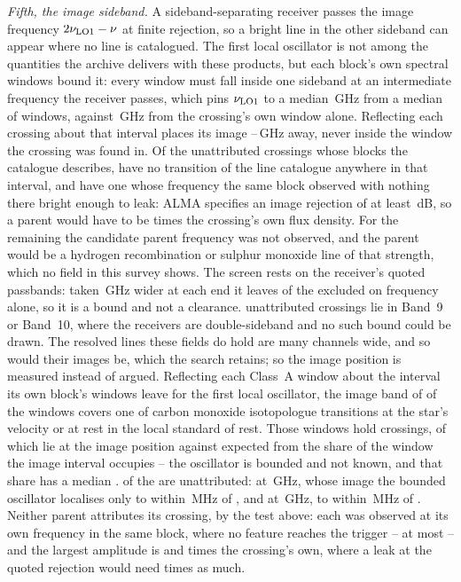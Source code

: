 \emph{Fifth, the image sideband.} A sideband-separating receiver passes the
image frequency $2\nu_{\rm LO1}-\nu$ at finite rejection, so a bright line
in the other sideband can appear where no line is catalogued. The first
local oscillator is not among the quantities the archive delivers with these
products, but each block's own spectral windows bound it: every window must
fall inside one sideband at an intermediate frequency the receiver passes,
which pins $\nu_{\rm LO1}$ to a median \ImLoWidthBlkGHz\,GHz from a median
of \ImNWinUsed{} windows, against \ImLoWidthOwnGHz\,GHz from the crossing's
own window alone. Reflecting each crossing about that interval places its
image \ImGapLoGHz--\ImGapHiGHz\,GHz away, never inside the window the
crossing was found in. Of the \ImNScreen{} unattributed crossings whose
blocks the catalogue describes, \ImNNoParent{} have no transition of the
line catalogue anywhere in that interval, and \ImNParentAbsent{} have one
whose frequency the same block observed with nothing there bright enough to
leak: ALMA specifies an image rejection of at least \ImIrrDb\,dB, so a
parent would have to be \ImIrrFac{} times the crossing's own flux density. For the
remaining \ImNLeft{} the candidate parent frequency was not observed, and
the parent would be a hydrogen recombination or sulphur monoxide line of
that strength, which no field in this survey shows. The screen rests on the
receiver's quoted passbands: taken \ImWideGHz\,GHz wider at each end it
leaves \ImNNoParentWide{} of the \ImNScreen{} excluded on frequency alone,
so it is a bound and not a clearance. \ImNDsb{} unattributed crossings lie
in Band~9 or Band~10, where the receivers are double-sideband and no such
bound could be drawn. The resolved lines these fields do hold are many
channels wide, and so would their images be, which the search retains; so the
image position is measured instead of argued. Reflecting each Class~A window
about the interval its own block's windows leave for the first local
oscillator, the image band of \ScImNCov{} of the \ScImNWin{} windows covers one
of \ScImNCo{} carbon monoxide isotopologue transitions at the star's velocity or
at rest in the local standard of rest. Those windows hold \ScImNCross{}
crossings, of which \ScImNHitCross{} lie at the image position against
\ScImExp{} expected from the share of the window the image interval occupies --
the oscillator is bounded and not known, and that share has a median
\ScImShareMed. \ScImNHitUn{} of the \ScImNHitCross{} are unattributed:
\ScImUnStarA{} at \ScImUnCrossA\,GHz, whose image the bounded oscillator
localises only to within \ScImUnOffA\,MHz of \ScImUnLineA, and
\ScImUnStarB{} at \ScImUnCrossB\,GHz, to within \ScImUnOffB\,MHz of
\ScImUnLineB. Neither parent attributes its crossing, by the test above:
each was observed at its own frequency in the same block, where no
feature reaches the trigger -- \ScImUnParMaxT{} at most -- and the largest
amplitude is \ScImUnRatioA{} and \ScImUnRatioB{} times the crossing's own,
where a leak at the quoted rejection would need \ImIrrFac{} times as much.

